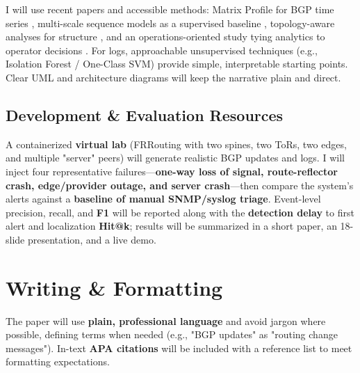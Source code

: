 \documentclass[11pt,letterpaper]{article}
\begin{document}
I will use recent papers and accessible methods: Matrix Profile for BGP time series \cite{scott2024}, multi-scale sequence models as a supervised baseline \cite{cheng2021}, topology-aware analyses for structure \cite{tan2024}, and an operations-oriented study tying analytics to operator decisions \cite{mohammed2021}. For logs, approachable unsupervised techniques (e.g., Isolation Forest / One-Class SVM) provide simple, interpretable starting points. Clear UML and architecture diagrams will keep the narrative plain and direct.

\subsection{Development \& Evaluation Resources}

A containerized \textbf{virtual lab} (FRRouting with two spines, two ToRs, two edges, and multiple "server" peers) will generate realistic BGP updates and logs. I will inject four representative failures—\textbf{one-way loss of signal, route-reflector crash, edge/provider outage, and server crash}—then compare the system's alerts against a \textbf{baseline of manual SNMP/syslog triage}. Event-level precision, recall, and \textbf{F1} will be reported along with the \textbf{detection delay} to first alert and localization \textbf{Hit@k}; results will be summarized in a short paper, an 18-slide presentation, and a live demo.

\section{Writing \& Formatting}

The paper will use \textbf{plain, professional language} and avoid jargon where possible, defining terms when needed (e.g., "BGP updates" as "routing change messages"). In-text \textbf{APA citations} will be included with a reference list to meet formatting expectations.



\end{document}
